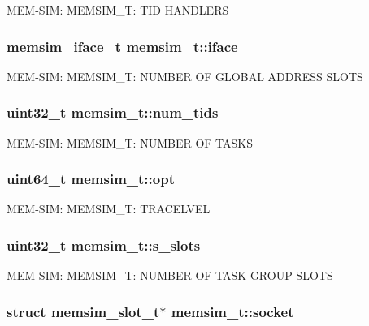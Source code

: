 M\-E\-M-\/\-S\-I\-M\-: M\-E\-M\-S\-I\-M\-\_\-\-T\-: T\-I\-D H\-A\-N\-D\-L\-E\-R\-S \hypertarget{structmemsim__t_a37831c21b74789b55a12495be077d120}{
\subsubsection[{iface}]{\setlength{\rightskip}{0pt plus 5cm}memsim\-\_\-iface\-\_\-t memsim\-\_\-t\-::iface}}\label{structmemsim__t_a37831c21b74789b55a12495be077d120}
M\-E\-M-\/\-S\-I\-M\-: M\-E\-M\-S\-I\-M\-\_\-\-T\-: N\-U\-M\-B\-E\-R O\-F G\-L\-O\-B\-A\-L A\-D\-D\-R\-E\-S\-S S\-L\-O\-T\-S \hypertarget{structmemsim__t_a321563b1d52ef49a39ee5ef3266f21ab}{
\subsubsection[{num\-\_\-tids}]{\setlength{\rightskip}{0pt plus 5cm}uint32\-\_\-t memsim\-\_\-t\-::num\-\_\-tids}}\label{structmemsim__t_a321563b1d52ef49a39ee5ef3266f21ab}
M\-E\-M-\/\-S\-I\-M\-: M\-E\-M\-S\-I\-M\-\_\-\-T\-: N\-U\-M\-B\-E\-R O\-F T\-A\-S\-K\-S \hypertarget{structmemsim__t_a34e92877e65240907a70bbfe16fd4a34}{
\subsubsection[{opt}]{\setlength{\rightskip}{0pt plus 5cm}uint64\-\_\-t memsim\-\_\-t\-::opt}}\label{structmemsim__t_a34e92877e65240907a70bbfe16fd4a34}
M\-E\-M-\/\-S\-I\-M\-: M\-E\-M\-S\-I\-M\-\_\-\-T\-: T\-R\-A\-C\-E\-L\-V\-E\-L \hypertarget{structmemsim__t_a35adeb1c88dde11bfe128119c723c037}{
\subsubsection[{s\-\_\-slots}]{\setlength{\rightskip}{0pt plus 5cm}uint32\-\_\-t memsim\-\_\-t\-::s\-\_\-slots}}\label{structmemsim__t_a35adeb1c88dde11bfe128119c723c037}
M\-E\-M-\/\-S\-I\-M\-: M\-E\-M\-S\-I\-M\-\_\-\-T\-: N\-U\-M\-B\-E\-R O\-F T\-A\-S\-K G\-R\-O\-U\-P S\-L\-O\-T\-S \hypertarget{structmemsim__t_a42ae6dd8a64e2d04c30e35354ec25555}{
\subsubsection[{socket}]{\setlength{\rightskip}{0pt plus 5cm}struct {\bf memsim\-\_\-slot\-\_\-t}$\ast$ memsim\-\_\-t\-::socket}}\label{structmemsim__t_a42ae6dd8a64e2d04c30e35354ec25555}
